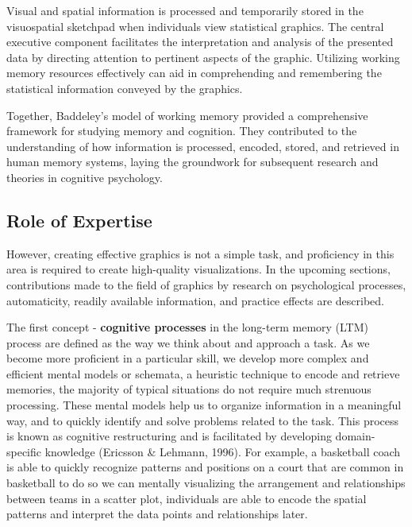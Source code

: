 \documentclass[print]{nuthesis}
\begin{document}
Visual and spatial information is processed and temporarily stored in the visuospatial sketchpad when individuals view statistical graphics.
The central executive component facilitates the interpretation and analysis of the presented data by directing attention to pertinent aspects of the graphic.
Utilizing working memory resources effectively can aid in comprehending and remembering the statistical information conveyed by the graphics.

Together, Baddeley's model of working memory provided a comprehensive framework for studying memory and cognition.
They contributed to the understanding of how information is processed, encoded, stored, and retrieved in human memory systems, laying the groundwork for subsequent research and theories in cognitive psychology.

\hypertarget{role-of-expertise}{%
\subsection{Role of Expertise}\label{role-of-expertise}}

However, creating effective graphics is not a simple task, and proficiency in this area is required to create high-quality visualizations.
In the upcoming sections, contributions made to the field of graphics by research on psychological processes, automaticity, readily available information, and practice effects are described.

The first concept - \textbf{cognitive processes} in the long-term memory (LTM) process are defined as the way we think about and approach a task.
As we become more proficient in a particular skill, we develop more complex and efficient mental models or schemata, a heuristic technique to encode and retrieve memories, the majority of typical situations do not require much strenuous processing.
These mental models help us to organize information in a meaningful way, and to quickly identify and solve problems related to the task.
This process is known as cognitive restructuring and is facilitated by developing domain-specific knowledge (Ericsson \& Lehmann, 1996).
For example, a basketball coach is able to quickly recognize patterns and positions on a court that are common in basketball to do so we can mentally visualizing the arrangement and relationships between teams in a scatter plot, individuals are able to encode the spatial patterns and interpret the data points and relationships later.
\end{document}
